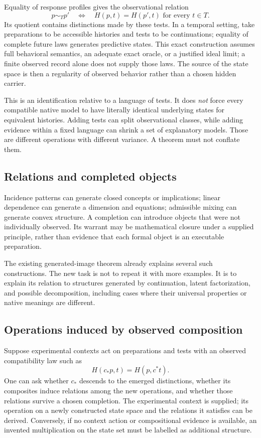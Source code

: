 \documentclass[11pt]{article}
\theoremstyle{remark}
\begin{document}
Equality of response profiles gives the observational relation
\[
 p\sim_Tp'\quad\Longleftrightarrow\quad H(p,t)=H(p',t)
 \text{ for every }t\in T.
\]
Its quotient contains distinctions made by these tests. In a temporal setting, take preparations to be accessible histories and tests to be continuations; equality of complete future laws generates predictive states. This exact construction assumes full behavioral semantics, an adequate exact oracle, or a justified ideal limit; a finite observed record alone does not supply those laws. The source of the state space is then a regularity of observed behavior rather than a chosen hidden carrier.

This is an identification relative to a language of tests. It does \emph{not} force every compatible native model to have literally identical underlying states for equivalent histories. Adding tests can split observational classes, while adding evidence within a fixed language can shrink a set of explanatory models. Those are different operations with different variance. A theorem must not conflate them.

\subsection{Relations and completed objects}

Incidence patterns can generate closed concepts or implications; linear dependence can generate a dimension and equations; admissible mixing can generate convex structure. A completion can introduce objects that were not individually observed. Its warrant may be mathematical closure under a supplied principle, rather than evidence that each formal object is an executable preparation.

The existing generated-image theorem already explains several such constructions. The new task is not to repeat it with more examples. It is to explain its relation to structures generated by continuation, latent factorization, and possible decomposition, including cases where their universal properties or native meanings are different.

\subsection{Operations induced by observed composition}

Suppose experimental contexts act on preparations and tests with an observed compatibility law such as
\begin{equation}
 H(c_*p,t)=H(p,c^*t).
 \label{eq:context-duality}
\end{equation}
One can ask whether $c_*$ descends to the emerged distinctions, whether its composites induce relations among the new operations, and whether those relations survive a chosen completion. The experimental context is supplied; its operation on a newly constructed state space and the relations it satisfies can be derived. Conversely, if no context action or compositional evidence is available, an invented multiplication on the state set must be labelled as additional structure.
\end{document}
